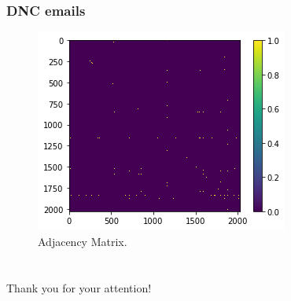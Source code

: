 \documentclass{beamer}
\theoremstyle{plain}
\theoremstyle{definition}
\theoremstyle{remark}
\begin{document}

\begin{frame}
\frametitle{DNC emails}

\begin{figure}
	\includegraphics[height=0.75\textheight,keepaspectratio]{figures/ad_mat_download}
	\caption{Adjacency Matrix.}
\end{figure}
\end{frame}

\section*{}
\begin{frame}

\centering
\Huge{Thank you for your attention!}

\end{frame}

\end{document}
